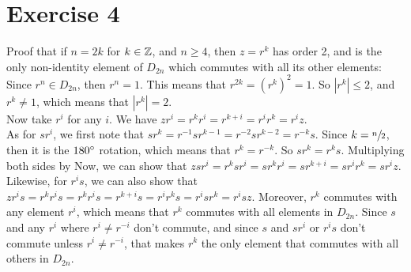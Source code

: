 \documentclass[12pt]{article}
\begin{document}
    \section*{Exercise 4}
    Proof that if $n = 2k$ for $k \in \mathbb{Z}$,
    and $n \geqslant 4$,
    then $z = r^k$ has order 2,
    and is the only non-identity element of $D_{2n}$
    which commutes with all its other elements: \\
    Since $r^n \in D_{2n}$,
    then $r^n = 1$.
    This means that $r^{2k} = (r^k)^2 = 1$.
    So $|r^k| \leqslant 2$,
    and $r^k \neq 1$,
    which means that $|r^k| = 2$. \\
    Now take $r^i$ for any $i$.
    We have $zr^i = r^kr^i = r^{k+i} = r^ir^k = r^iz$. \\
    As for $sr^i$,
    we first note that $sr^k = r^{-1}sr^{k-1} 
    = r^{-2}sr^{k-2}
    = r^{-k}s$.
    Since $k = \sfrac{n}{2}$,
    then it is the $180 \degree$ rotation, which means that $r^k = r^{-k}$.
    So $sr^k = r^ks$.
    Multiplying both sides by 
    Now, we can show that $zsr^i = r^ksr^i
    = sr^kr^i
    = sr^{k + i}
    = sr^ir^k
    = sr^iz$.
    Likewise, for $r^is$,
    we can also show that $zr^is = r^kr^is
    = r^kr^is
    = r^{k + i}s
    = r^ir^ks
    = r^isr^k
    = r^isz$.
    Moreover, $r^k$ commutes with any element $r^i$,
    which means that $r^k$ commutes with all elements in $D_{2n}$.
    Since $s$ and any $r^i$ where $r^i \neq r^{-i}$ don't commute,
    and since $s$ and $sr^i$ or $r^is$ don't commute unless $r^i \neq r^{-i}$,
    that makes $r^k$ the only element that commutes with all others
    in $D_{2n}$.
\end{document}

